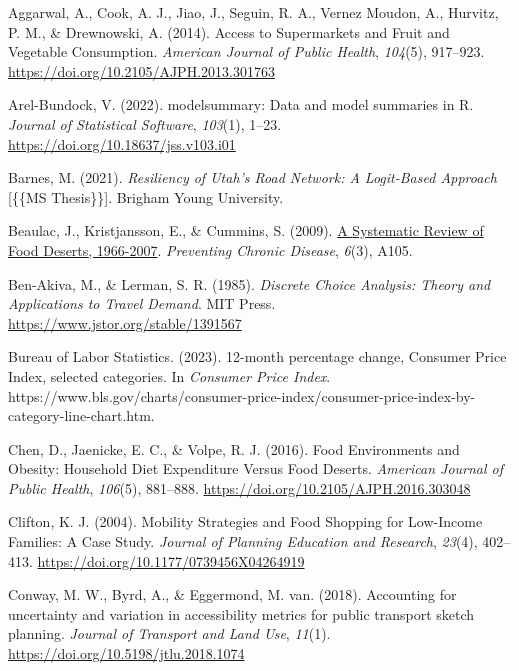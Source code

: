 \documentclass[
  letterpaper,
  number,
  review,
  3p]{elsarticle}
\newlength{\cslhangindent}
\newenvironment{CSLReferences}[2] %
 {\begin{list}{}{%
  \setlength{\itemindent}{0pt}
  \setlength{\leftmargin}{0pt}
  \setlength{\parsep}{0pt}
  \ifodd #1
   \setlength{\leftmargin}{\cslhangindent}
   \setlength{\itemindent}{-1\cslhangindent}
  \fi
  \setlength{\itemsep}{#2\baselineskip}}}
 {\end{list}}
\begin{document}

\label{refs}
\begin{CSLReferences}{1}{0}
Aggarwal, A., Cook, A. J., Jiao, J., Seguin, R. A., Vernez Moudon, A.,
Hurvitz, P. M., \& Drewnowski, A. (2014). Access to {Supermarkets} and
{Fruit} and {Vegetable Consumption}. \emph{American Journal of Public
Health}, \emph{104}(5), 917--923.
\url{https://doi.org/10.2105/AJPH.2013.301763}

Arel-Bundock, V. (2022). {modelsummary}: Data and model summaries in
{R}. \emph{Journal of Statistical Software}, \emph{103}(1), 1--23.
\url{https://doi.org/10.18637/jss.v103.i01}

Barnes, M. (2021). \emph{Resiliency of {Utah}'s {Road Network}: {A
Logit-Based Approach}} {[}\{\{MS Thesis\}\}{]}. Brigham Young
University.

Beaulac, J., Kristjansson, E., \& Cummins, S. (2009).
\href{https://www.ncbi.nlm.nih.gov/pmc/articles/PMC2722409}{A
{Systematic Review} of {Food Deserts}, 1966-2007}. \emph{Preventing
Chronic Disease}, \emph{6}(3), A105.

Ben-Akiva, M., \& Lerman, S. R. (1985). \emph{Discrete {Choice
Analysis}: {Theory} and {Applications} to {Travel Demand}}. MIT Press.
\url{https://www.jstor.org/stable/1391567}

Bureau of Labor Statistics. (2023). 12-month percentage change,
{Consumer Price Index}, selected categories. In \emph{Consumer Price
Index}.
https://www.bls.gov/charts/consumer-price-index/consumer-price-index-by-category-line-chart.htm.

Chen, D., Jaenicke, E. C., \& Volpe, R. J. (2016). Food {Environments}
and {Obesity}: {Household Diet Expenditure Versus Food Deserts}.
\emph{American Journal of Public Health}, \emph{106}(5), 881--888.
\url{https://doi.org/10.2105/AJPH.2016.303048}

Clifton, K. J. (2004). Mobility {Strategies} and {Food Shopping} for
{Low-Income Families}: {A Case Study}. \emph{Journal of Planning
Education and Research}, \emph{23}(4), 402--413.
\url{https://doi.org/10.1177/0739456X04264919}

Conway, M. W., Byrd, A., \& Eggermond, M. van. (2018). Accounting for
uncertainty and variation in accessibility metrics for public transport
sketch planning. \emph{Journal of Transport and Land Use}, \emph{11}(1).
\url{https://doi.org/10.5198/jtlu.2018.1074}


\end{CSLReferences}
\end{document}

